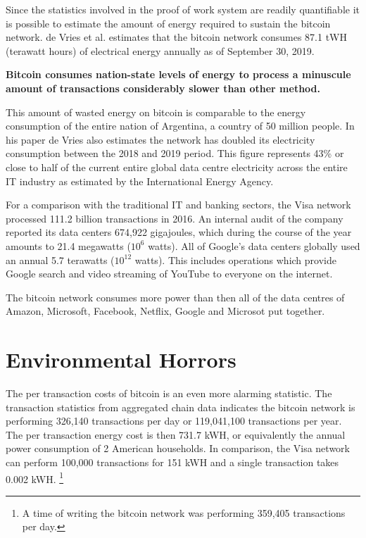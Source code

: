 Since the statistics involved in the proof of work system are readily
quantifiable it is possible to estimate the amount of energy required to
sustain the bitcoin network. de Vries et al. estimates that the bitcoin
network consumes 87.1 tWH (terawatt hours) of electrical energy annually
as of September 30, 2019. \cite{de2020bitcoin}

\begin{infobox}
 \textbf{ Bitcoin consumes nation-state levels of energy to process a minuscule
  amount of transactions considerably slower than other method.}
\end{infobox}

This amount of wasted energy on bitcoin is comparable to the energy consumption
of the entire nation of Argentina, a country of 50 million people. In his paper
de Vries also estimates the network has doubled its electricity consumption
between the 2018 and 2019 period. This figure represents 43\% or close to half
of the current entire global data centre electricity across the entire IT
industry as estimated by the International Energy Agency.
\cite{international2019key}

For a comparison with the traditional IT and banking sectors, the Visa
network processed 111.2 billion transactions in 2016. An internal audit
of the company reported its data centers 674,922 gigajoules, which
during the course of the year amounts to 21.4 megawatts ($10^6$ watts). All
of Google's data centers globally used an annual 5.7 terawatts ($10^{12}$
watts). This includes operations which provide Google search and video
streaming of YouTube to everyone on the internet.

The bitcoin network consumes more power than then all of the data centres of
Amazon, Microsoft, Facebook, Netflix, Google and Microsot put together.

\section{Environmental Horrors}

The per transaction costs of bitcoin is an even more alarming statistic.  The
transaction statistics from aggregated chain data indicates the bitcoin network
is performing 326,140 transactions per day or 119,041,100 transactions per year.
The per transaction energy cost is then 731.7 kWH, or equivalently the annual
power consumption of 2 American households. In comparison, the Visa network can
perform 100,000 transactions for 151 kWH and a single transaction takes 0.002
kWH.  \footnote{A time of writing the bitcoin network was performing 359,405
transactions per day.}

